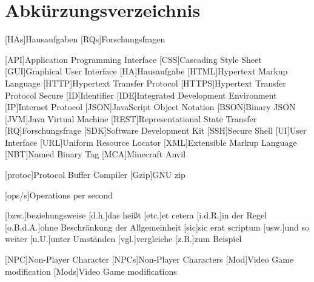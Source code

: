 \chapter*{Abkürzungsverzeichnis}


[HAs]{Hausaufgaben}
[RQs]{Forschungsfragen}

\begin{acronym}[XXXXXX] %
    [API]{Application Programming Interface}
    [CSS]{Cascading Style Sheet}
    [GUI]{Graphical User Interface}
    [HA]{Hausaufgabe}
    [HTML]{Hypertext Markup Language}
    [HTTP]{Hypertext Transfer Protocol}
    [HTTPS]{Hypertext Transfer Protocol Secure}
    [ID]{Identifier}
    [IDE]{Integrated Development Environment}
    [IP]{Internet Protocol}
    [JSON]{JavaScript Object Notation}
    [BSON]{Binary JSON}
    [JVM]{Java Virtual Machine}
    [REST]{Representational State Transfer}
    [RQ]{Forschungsfrage}
    [SDK]{Software Development Kit}
    [SSH]{Secure Shell}
    [UI]{User Interface}
    [URL]{Uniform Resource Locator}
    [XML]{Extensible Markup Language}
    [NBT]{Named Binary Tag}
    [MCA]{Minecraft Anvil}

    \vspace{\parskip}

    [protoc]{Protocol Buffer Compiler}
    [Gzip]{GNU zip}

    \vspace{\parskip}

    [ops/s]{Operations per second}

    \vspace{\parskip}

    [bzw.]{beziehungsweise}
    [d.h.]{das heißt}
    [etc.]{et cetera}
    [i.d.R.]{in der Regel}
    [o.B.d.A.]{ohne Beschränkung der Allgemeinheit}
    [sic]{sic erat scriptum}
    [usw.]{und so weiter}
    [u.U.]{unter Umständen}
    [vgl.]{vergleiche}
    [z.B.]{zum Beispiel}

    \vspace{\parskip}

    [NPC]{Non-Player Character}
    [NPCs]{Non-Player Characters}
    [Mod]{Video Game modification}
    [Mods]{Video Game modifications}
\end{acronym}
